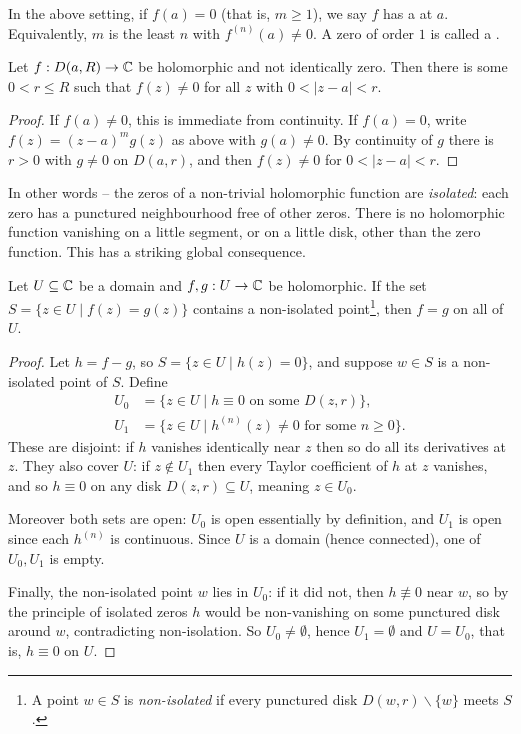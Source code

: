 \documentclass[a4paper]{scrartcl}
\begin{document}
\begin{definition}
    In the above setting, if $f(a) = 0$ (that is, $m \geq 1$), we say $f$ has a  at $a$. Equivalently, $m$ is the least $n$ with $f^{(n)}(a) \neq 0$. A zero of order $1$ is called a .
\end{definition}

\begin{theorem}
    Let $f: D(a, R) \rightarrow \mathbb{C}$ be holomorphic and not identically zero. Then there is some $0 < r \leq R$ such that $f(z) \neq 0$ for all $z$ with $0 < |z - a| < r$.
\end{theorem}
\begin{proof}
    If $f(a) \neq 0$, this is immediate from continuity. If $f(a) = 0$, write $f(z) = (z - a)^m g(z)$ as above with $g(a) \neq 0$. By continuity of $g$ there is $r > 0$ with $g \neq 0$ on $D(a, r)$, and then $f(z) \neq 0$ for $0 < |z - a| < r$.
\end{proof}

In other words -- the zeros of a non-trivial holomorphic function are \emph{isolated}: each zero has a punctured neighbourhood free of other zeros. There is no holomorphic function vanishing on a little segment, or on a little disk, other than the zero function. This has a striking global consequence.

\begin{theorem}
    Let $U \subseteq \mathbb{C}$ be a domain and $f, g: U \rightarrow \mathbb{C}$ be holomorphic. If the set $S = \{z \in U \mid f(z) = g(z)\}$ contains a non-isolated point\footnote{A point $w \in S$ is \emph{non-isolated} if every punctured disk $D(w, r) \backslash \{w\}$ meets $S$.}, then $f = g$ on all of $U$.
\end{theorem}
\begin{proof}
    Let $h = f - g$, so $S = \{z \in U \mid h(z) = 0\}$, and suppose $w \in S$ is a non-isolated point of $S$. Define
    \begin{align*}
    U_0 &= \{z \in U \mid h \equiv 0 \text{ on some } D(z, r)\}, \\
    U_1 &= \{z \in U \mid h^{(n)}(z) \neq 0 \text{ for some } n \geq 0\}.
    \end{align*}
    These are disjoint: if $h$ vanishes identically near $z$ then so do all its derivatives at $z$. They also cover $U$: if $z \notin U_1$ then every Taylor coefficient of $h$ at $z$ vanishes, and so $h \equiv 0$ on any disk $D(z, r) \subseteq U$, meaning $z \in U_0$.

    Moreover both sets are open: $U_0$ is open essentially by definition, and $U_1$ is open since each $h^{(n)}$ is continuous. Since $U$ is a domain (hence connected), one of $U_0, U_1$ is empty.

    Finally, the non-isolated point $w$ lies in $U_0$: if it did not, then $h \not\equiv 0$ near $w$, so by the principle of isolated zeros $h$ would be non-vanishing on some punctured disk around $w$, contradicting non-isolation. So $U_0 \neq \emptyset$, hence $U_1 = \emptyset$ and $U = U_0$, that is, $h \equiv 0$ on $U$.
\end{proof}
\end{document}
